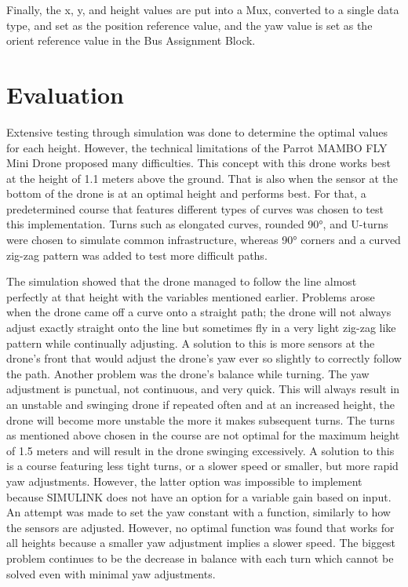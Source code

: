 \documentclass[a4paper, 10pt, conference]{IEEEtran}
\begin{document}
Finally, the x, y, and height values are put into a Mux, converted to a single data type, and set as the position reference value, and the yaw value is set as the orient reference value in the Bus Assignment Block.\\ 


\section{Evaluation}
Extensive testing through simulation was done to determine the optimal values for each height. However, the technical limitations of the Parrot MAMBO FLY Mini Drone proposed many difficulties.
This concept with this drone works best at the height of 1.1 meters above the ground. That is also when the sensor at the bottom of the drone is at an optimal height and performs best. For that, a predetermined course that features different types of curves was chosen to test this implementation. Turns such as elongated curves, rounded 90°, and U-turns were chosen to simulate common infrastructure, whereas 90° corners and a curved zig-zag pattern was added to test more difficult paths.\\\par
The simulation showed that the drone managed to follow the line almost perfectly at that height with the variables mentioned earlier. 
Problems arose when the drone came off a curve onto a straight path; the drone will not always adjust exactly straight onto the line but sometimes fly in a very light zig-zag like pattern while continually adjusting. A solution to this is more sensors at the drone’s front that would adjust the drone’s yaw ever so slightly to correctly follow the path.
Another problem was the drone’s balance while turning. The yaw adjustment is punctual, not continuous, and very quick. This will always result in an unstable and swinging drone if repeated often and at an increased height, the drone will become more unstable the more it makes subsequent turns. The turns as mentioned above chosen in the course are not optimal for the maximum height of 1.5 meters and will result in the drone swinging excessively.
A solution to this is a course featuring less tight turns, or a slower speed or smaller, but more rapid yaw adjustments. However, the latter option was impossible to implement because SIMULINK does not have an option for a variable gain based on input. An attempt was made to set the yaw constant with a function, similarly to how the sensors are adjusted. However, no optimal function was found that works for all heights because a smaller yaw adjustment implies a slower speed.
The biggest problem continues to be the decrease in balance with each turn which cannot be solved even with minimal yaw adjustments.\\
\end{document}
